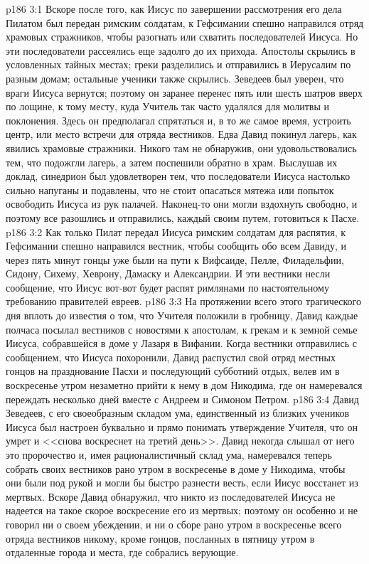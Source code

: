 \vs p186 3:1 Вскоре после того, как Иисус по завершении рассмотрения его дела Пилатом был передан римским солдатам, к Гефсимании спешно направился отряд храмовых стражников, чтобы разогнать или схватить последователей Иисуса. Но эти последователи рассеялись еще задолго до их прихода. Апостолы скрылись в условленных тайных местах; греки разделились и отправились в Иерусалим по разным домам; остальные ученики также скрылись. Зеведеев был уверен, что враги Иисуса вернутся; поэтому он заранее перенес пять или шесть шатров вверх по лощине, к тому месту, куда Учитель так часто удалялся для молитвы и поклонения. Здесь он предполагал спрятаться и, в то же самое время, устроить центр, или место встречи для отряда вестников. Едва Давид покинул лагерь, как явились храмовые стражники. Никого там не обнаружив, они удовольствовались тем, что подожгли лагерь, а затем поспешили обратно в храм. Выслушав их доклад, синедрион был удовлетворен тем, что последователи Иисуса настолько сильно напуганы и подавлены, что не стоит опасаться мятежа или попыток освободить Иисуса из рук палачей. Наконец\hyp{}то они могли вздохнуть свободно, и поэтому все разошлись и отправились, каждый своим путем, готовиться к Пасхе.
\vs p186 3:2 Как только Пилат передал Иисуса римским солдатам для распятия, к Гефсимании спешно направился вестник, чтобы сообщить обо всем Давиду, и через пять минут гонцы уже были на пути к Вифсаиде, Пелле, Филадельфии, Сидону, Сихему, Хеврону, Дамаску и Александрии. И эти вестники несли сообщение, что Иисус вот\hyp{}вот будет распят римлянами по настоятельному требованию правителей евреев.
\vs p186 3:3 На протяжении всего этого трагического дня вплоть до известия о том, что Учителя положили в гробницу, Давид каждые полчаса посылал вестников с новостями к апостолам, к грекам и к земной семье Иисуса, собравшейся в доме у Лазаря в Вифании. Когда вестники отправились с сообщением, что Иисуса похоронили, Давид распустил свой отряд местных гонцов на празднование Пасхи и последующий субботний отдых, велев им в воскресенье утром незаметно прийти к нему в дом Никодима, где он намеревался переждать несколько дней вместе с Андреем и Симоном Петром.
\vs p186 3:4 Давид Зеведеев, с его своеобразным складом ума, единственный из близких учеников Иисуса был настроен буквально и прямо понимать утверждение Учителя, что он умрет и <<снова воскреснет на третий день>>. Давид некогда слышал от него это пророчество и, имея рационалистичный склад ума, намеревался теперь собрать своих вестников рано утром в воскресенье в доме у Никодима, чтобы они были под рукой и могли бы быстро разнести весть, если Иисус восстанет из мертвых. Вскоре Давид обнаружил, что никто из последователей Иисуса не надеется на такое скорое воскресение его из мертвых; поэтому он особенно и не говорил ни о своем убеждении, и ни о сборе рано утром в воскресенье всего отряда вестников никому, кроме гонцов, посланных в пятницу утром в отдаленные города и места, где собрались верующие.
